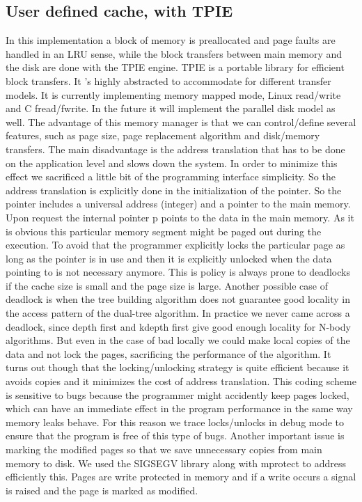 \documentclass[12pt,letterpaper,doublespaced,ETD,dvips,proposal]{gtthesis}
\begin{document}
\begin{Body}
\subsection{User defined cache, with TPIE} In this implementation a
block of memory is preallocated and page faults are handled in an
LRU sense, while the block transfers between main memory and the
disk are done with the TPIE engine. TPIE is a portable library for
efficient block transfers. It 's highly abstracted to accommodate
for different transfer models. It is currently implementing memory
mapped mode, Linux read/write and C fread/fwrite. In the future it
will implement the parallel disk model as well. The advantage of
this memory manager is that we can control/define several features,
such as page size, page replacement algorithm and disk/memory
transfers. The main disadvantage is the address translation that has
to be done on the application level and slows down the system. In
order to minimize this effect we sacrificed a little bit of the
programming interface simplicity. So the address translation is
explicitly done in the initialization of the pointer. So the pointer
includes a universal address (integer) and a pointer to the main
memory. Upon request the internal pointer p points to the data in
the main memory. As it is obvious this particular memory segment
might be paged out during the execution. To avoid that the
programmer explicitly locks the particular page as long as the
pointer is in use and then it is explicitly unlocked when the data
pointing to is not necessary anymore. This is  policy is always
prone to deadlocks if the cache size is small and the page size is
large. Another possible case of deadlock is when the tree building
algorithm does not guarantee good locality in the access pattern of
the dual-tree algorithm. In practice we never came across a
deadlock, since depth first and kdepth first give good enough
locality for N-body algorithms. But even in the case of bad locally
we could make local copies of the data and not lock the pages,
sacrificing the performance of the algorithm. It turns out though
that the locking/unlocking strategy is quite efficient because it
avoids copies and it minimizes the cost of address translation. This
coding scheme is sensitive to bugs because the programmer might
accidently keep pages locked, which can have an immediate effect in
the program performance in the same way memory leaks behave. For
this reason we trace locks/unlocks in debug mode to ensure that the
program is free of this type of bugs. Another important issue is
marking the modified pages so that we save unnecessary copies from
main memory to disk. We used the SIGSEGV library along with mprotect
to address efficiently this. Pages are write protected in memory and
if a write occurs a signal is raised and the page is marked as
modified.


\end{Body}
\end{document}
